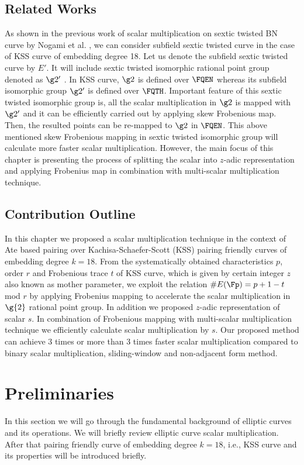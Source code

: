\subsection{Related Works}
As shown in the previous work of scalar multiplication on sextic twisted BN curve by Nogami et al. \cite{DBLP:journals/ieicet/NogamiSONAM09}, we can consider subfield sextic twisted curve in the case of KSS curve of embedding degree 18. Let us denote the subfield sextic twisted curve by $E'$. It will include sextic twisted isomorphic rational point group denoted as $\g2'$ . In KSS curve, $\g2$ is defined over $\FQEN$ whereas its subfield isomorphic group $\g2'$ is defined over $\FQTH$. Important feature of this sextic twisted isomorphic group is, all the scalar multiplication in $\g2$ is mapped with $\g2'$ and it can be efficiently carried out by applying skew Frobenious map. Then, the resulted points can be re-mapped to $\g2$ in $\FQEN$.  This above mentioned skew Frobenious mapping in sextic twisted isomorphic group will calculate more faster scalar multiplication. However, the main focus of this chapter is presenting the process of splitting the scalar into $z$-adic representation and  applying Frobenius map in combination with multi-scalar multiplication technique.

\subsection{Contribution Outline}
In this chapter we proposed a scalar multiplication technique in the context of Ate based pairing over  Kachisa-Schaefer-Scott (KSS) pairing friendly curves of embedding degree $k = 18$.
From the systematically obtained characteristics $p$, order $r$ and Frobenious trace $t$ of KSS curve, which is given by certain integer $z$ also known as mother parameter, we exploit the relation $\#E(\Fp) = p+1-t$ mod $r$  by applying Frobenius mapping to accelerate the scalar multiplication in $\g{2}$ rational point group.
In addition we proposed $z$-adic representation of scalar $s$.
In combination of Frobenious mapping with multi-scalar multiplication technique we efficiently calculate scalar multiplication by $s$.
Our proposed method can achieve 3 times or more than 3 times faster scalar multiplication compared to binary scalar multiplication, sliding-window and non-adjacent form method.

\section{Preliminaries}
In this section we will go through the fundamental background of elliptic curves and its operations. We will briefly review elliptic curve scalar multiplication. After that pairing friendly curve of embedding degree $k=18$, i.e., KSS curve and its properties will be introduced briefly.
